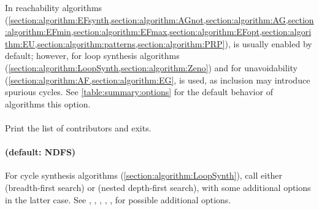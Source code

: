 In reachability algorithms (\cref{section:algorithm:EFsynth,section:algorithm:AGnot,section:algorithm:AG,section:algorithm:EFmin,section:algorithm:EFmax,section:algorithm:EFopt,section:algorithm:EU,section:algorithm:patterns,section:algorithm:PRP}),  is usually enabled by default; however, for loop synthesis algorithms (\cref{section:algorithm:LoopSynth,section:algorithm:Zeno}) and for unavoidability (\cref{section:algorithm:AF,section:algorithm:EG},  is used, as inclusion may introduce spurious cycles.
%
See \cref{table:summary:options} for the default behavior of algorithms \wrt{} this option.




%


\paragraph{}
Print the list of contributors and exits.



\paragraph{ (default: NDFS)}
For cycle synthesis algorithms (\cref{section:algorithm:LoopSynth}), call either  (breadth-first search) or  (nested depth-first search), with some additional options in the latter case.
See
	,
	,
	,
	,
	,
for possible additional options.





